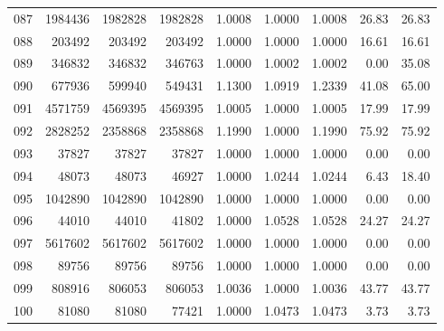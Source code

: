 \begin{longtable}{crrrrrrrr}
087 & 1984436 & 1982828 & 1982828 & 1.0008 & 1.0000 & 1.0008 & 26.83 & 26.83 \\
088 & 203492 & 203492 & 203492 & 1.0000 & 1.0000 & 1.0000 & 16.61 & 16.61 \\
089 & 346832 & 346832 & 346763 & 1.0000 & 1.0002 & 1.0002 & 0.00 & 35.08 \\
090 & 677936 & 599940 & 549431 & 1.1300 & 1.0919 & 1.2339 & 41.08 & 65.00 \\
091 & 4571759 & 4569395 & 4569395 & 1.0005 & 1.0000 & 1.0005 & 17.99 & 17.99 \\
092 & 2828252 & 2358868 & 2358868 & 1.1990 & 1.0000 & 1.1990 & 75.92 & 75.92 \\
093 & 37827 & 37827 & 37827 & 1.0000 & 1.0000 & 1.0000 & 0.00 & 0.00 \\
094 & 48073 & 48073 & 46927 & 1.0000 & 1.0244 & 1.0244 & 6.43 & 18.40 \\
095 & 1042890 & 1042890 & 1042890 & 1.0000 & 1.0000 & 1.0000 & 0.00 & 0.00 \\
096 & 44010 & 44010 & 41802 & 1.0000 & 1.0528 & 1.0528 & 24.27 & 24.27 \\
097 & 5617602 & 5617602 & 5617602 & 1.0000 & 1.0000 & 1.0000 & 0.00 & 0.00 \\
098 & 89756 & 89756 & 89756 & 1.0000 & 1.0000 & 1.0000 & 0.00 & 0.00 \\
099 & 808916 & 806053 & 806053 & 1.0036 & 1.0000 & 1.0036 & 43.77 & 43.77 \\
100 & 81080 & 81080 & 77421 & 1.0000 & 1.0473 & 1.0473 & 3.73 & 3.73 \\
\end{longtable}

